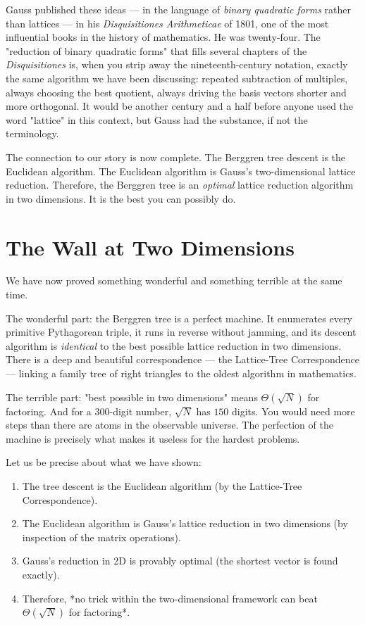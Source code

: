 Gauss published these ideas --- in the language of \textit{binary quadratic forms} rather than lattices --- in his \textit{Disquisitiones Arithmeticae} of 1801, one of the most influential books in the history of mathematics. He was twenty-four. The "reduction of binary quadratic forms" that fills several chapters of the \textit{Disquisitiones} is, when you strip away the nineteenth-century notation, exactly the same algorithm we have been discussing: repeated subtraction of multiples, always choosing the best quotient, always driving the basis vectors shorter and more orthogonal. It would be another century and a half before anyone used the word "lattice" in this context, but Gauss had the substance, if not the terminology.

The connection to our story is now complete. The Berggren tree descent is the Euclidean algorithm. The Euclidean algorithm is Gauss's two-dimensional lattice reduction. Therefore, the Berggren tree is an \textit{optimal} lattice reduction algorithm in two dimensions. It is the best you can possibly do.


\ornbreak



\section{The Wall at Two Dimensions}


We have now proved something wonderful and something terrible at the same time.

The wonderful part: the Berggren tree is a perfect machine. It enumerates every primitive Pythagorean triple, it runs in reverse without jamming, and its descent algorithm is \textit{identical} to the best possible lattice reduction in two dimensions. There is a deep and beautiful correspondence --- the Lattice-Tree Correspondence --- linking a family tree of right triangles to the oldest algorithm in mathematics.

The terrible part: "best possible in two dimensions" means $\Theta(\sqrt{N})$ for factoring. And for a $300$-digit number, $\sqrt{N}$ has $150$ digits. You would need more steps than there are atoms in the observable universe. The perfection of the machine is precisely what makes it useless for the hardest problems.

Let us be precise about what we have shown:

\begin{enumerate}[leftmargin=*]
\item The tree descent is the Euclidean algorithm (by the Lattice-Tree Correspondence).
\item The Euclidean algorithm is Gauss's lattice reduction in two dimensions (by inspection of the matrix operations).
\item Gauss's reduction in 2D is provably optimal (the shortest vector is found exactly).
\item Therefore, *no trick within the two-dimensional framework can beat $\Theta(\sqrt{N})$ for factoring*.
\end{enumerate}

